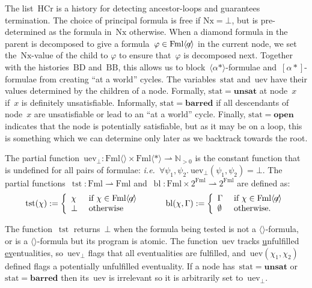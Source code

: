 \documentclass{entcs}
\newcommand{\ie}{\emph{i.e.}}
\newcommand{\Natp}{{\mathbb N_{>0}}}
\newcommand{\pea}[2]{\langle#1\rangle #2}
\newcommand{\paa}[2]{[#1] #2}
\newcommand{\prp}[1]{#1*}
\newcommand{\fml}{\mathrm{Fml}}
\newcommand{\fea}{$\pea{}{}$}
\newcommand{\fmlea}{\mathrm{Fml}\pea{}{}}
\newcommand{\fmlean}{\mathrm{Fml}\pea{\not\!\!a}{}}
\newcommand{\fmler}{\mathrm{Fml}\pea{\prp{}}{}}
\newcommand{\thc}{\mathrm{HCr}}
\newcommand{\tnext}{\mathrm{Nx}}
\newcommand{\tbdia}{\mathrm{BD}}
\newcommand{\tbbox}{\mathrm{BB}}
\newcommand{\tmrk}{\mathrm{stat}}
\newcommand{\tuev}{\mathrm{uev}}
\newcommand{\ttrue}{\mathbf{unsat}}
\newcommand{\tloop}{\mathbf{barred}}
\newcommand{\tfalse}{\mathbf{open}}
\newcommand{\tfean}{\mathop{\mathrm{tst}}}
\newcommand{\tbl}{\mathop{\mathrm{bl}}}
\begin{document}
The list~$\thc$ is a history for detecting ancestor-loops and guarantees termination. 
The choice of principal formula is free if $\tnext = \bot$, but is pre-determined as the
formula in~$\tnext$ otherwise.
When a diamond formula in the parent is decomposed
to give a formula~$\varphi \in \fmlean$ in the current node,
we set the~$\tnext$-value of the child to $\varphi$ to  ensure that~$\varphi$ is decomposed next.
Together with the histories~$\tbdia$ and~$\tbbox$,
this allows us to block~$\pea{\prp{\alpha}}{}$-formulae and~$\paa{\prp{\alpha}}{}$-formulae
from creating ``at a world'' cycles.
The variables~$\tmrk$ and~$\tuev$ have their values
determined by the children of a node.
Formally, $\tmrk = \ttrue$ at node~$x$
if~$x$ is definitely unsatisfiable.
Informally, $\tmrk = \tloop$ if all descendants of node~$x$ are unsatisfiable
or lead to an ``at a world'' cycle.
Finally, $\tmrk = \tfalse$ indicates that the node is potentially satisfiable,
but as it may be on a loop,
this is something which we can determine only later as we backtrack towards the root. 

\begin{definition}
  The partial function~$\tuev_{\bot} : \fmlea \times \fmler \rightharpoonup \Natp$ is the constant function
  that is undefined for all pairs of formulae: \ie{}~$\forall \psi_1, \psi_2.\: \tuev_{\bot}(\psi_1, \psi_2) = \bot$.
  The partial functions~$\tfean : \fml \rightharpoonup \fml$ and~$\tbl : \fml \times 2^{\fml} \rightharpoonup 2^{\fml}$ are defined as:
  \begin{displaymath}
    \begin{array}{l@{\extracolsep{1cm}}r}
      \tfean(\chi) := 
      \left\{
        \begin{array}{ll}
          \chi & \text{ if } \chi \in \fmlean\\
          \bot & \text{ otherwise}
        \end{array}
      \right .
      &
      \tbl(\chi, \Gamma) := 
      \left\{
        \begin{array}{ll}
          \Gamma & \text{ if } \chi \in \fmlean\\
          \emptyset & \text{ otherwise.}
        \end{array}
      \right .
    \end{array}
  \end{displaymath}
\end{definition}
The function~$\tfean{}$ returns~$\bot$
when the formula being tested is not a \fea{}-formula,
or is a \fea{}-formula but its program is atomic.
The function~$\tuev$ tracks
\underline{u}nfulfilled \underline{ev}entualities,
so~$\tuev_{\bot}$ flags that all eventualities are fulfilled,
and~$\tuev(\chi_1, \chi_2)$ defined flags a potentially unfulfilled eventuality.
If a node has~$\tmrk = \ttrue$ or~$\tmrk = \tloop$
then its~$\tuev$ is irrelevant so it is arbitrarily set to~$\tuev_{\bot}$.
\end{document}
